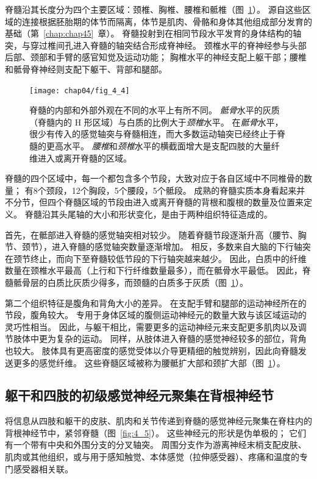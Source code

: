 脊髓沿其长度分为四个主要区域：颈椎、胸椎、腰椎和骶椎（图~\ref{fig:4_4}）。 
源自这些区域的连接根据胚胎期的体节而隔离，体节是肌肉、骨骼和身体其他组成部分发育的基础（第~\ref{chap:chap45}~章）。 
脊髓投射到在相同节段水平发育的身体结构的轴突，与穿过椎间孔进入脊髓的轴突结合形成脊神经。
颈椎水平的脊神经参与头部后部、颈部和手臂的感官知觉及运动功能；
胸椎水平的神经支配上躯干部；腰椎和骶骨脊神经则支配下躯干、背部和腿部。


\begin{figure}[htbp]
	\centering
	\texttt{[image: chap04/fig\_4\_4]}
	\caption{脊髓的内部和外部外观在不同的水平上有所不同。
		\textit{骶骨}水平的灰质（脊髓内的 H 形区域）与白质的比例大于\textit{颈椎}水平。
		在\textit{骶骨}水平，很少有传入的感觉轴突与脊髓相连，而大多数运动轴突已经终止于脊髓的更高水平。
		\textit{腰椎}和\textit{颈椎}水平的横截面增大是支配四肢的大量纤维进入或离开脊髓的区域。}
	\label{fig:4_4}
\end{figure}


脊髓的四个区域中，每一个都包含多个节段，大致对应于各自区域中不同椎骨的数量；
有8个颈段，12个胸段，5个腰段，5个骶段。
成熟的脊髓实质本身看起来并不分节，但四个脊髓区域的节段由进入或离开脊髓的背根和腹根的数量及位置来定义。
脊髓沿其头尾轴的大小和形状变化，是由于两种组织特征造成的。


首先，在骶部进入脊髓的感觉轴突相对较少。
随着脊髓节段逐渐升高（腰节、胸节、颈节），进入脊髓的感觉轴突数量逐渐增加。
相反，多数来自大脑的下行轴突在颈节终止，而向下至脊髓较低节段的下行轴突越来越少。
因此，白质中的纤维数量在颈椎水平最高（上行和下行纤维数量最多），而在骶骨水平最低。
因此，脊髓骶骨层的白质比灰质少得多，而颈髓的白质多于灰质（图~\ref{fig:4_4}）。


第二个组织特征是腹角和背角大小的差异。
在支配手臂和腿部的运动神经所在的节段，腹角较大。
专用于身体区域的腹侧运动神经元的数量大致与该区域运动的灵巧性相当。
因此，与躯干相比，需要更多的运动神经元来支配更多肌肉以及调节肢体中更为复杂的运动。
同样，从肢体进入脊髓的感觉神经较多的部位，背角也较大。
肢体具有更高密度的感觉受体以介导更精细的触觉辨别，因此向脊髓发送更多的感觉纤维。
这些脊髓区域被称为腰骶扩大部和颈扩大部（图~\ref{fig:4_4}）。



\subsection{躯干和四肢的初级感觉神经元聚集在背根神经节}

将信息从四肢和躯干的皮肤、肌肉和关节传递到脊髓的感觉神经元聚集在脊柱内的背根神经节中，紧邻脊髓（图~\ref{fig:4_5}）。 
这些神经元的形状是伪单极的；
它们有一个带有中央和外围分支的分叉轴突。
周围分支作为游离神经末梢支配皮肤、肌肉或其他组织，或与用于感知触觉、本体感觉（拉伸感受器）、疼痛和温度的专门感受器相关联。


